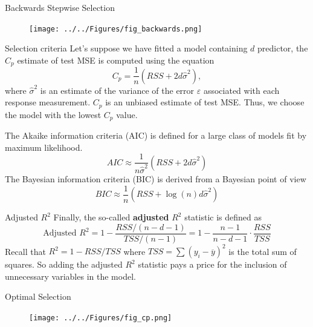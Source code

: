 \documentclass{beamer}
\begin{document}
\begin{frame}{Backwards Stepwise Selection}
	
	\begin{figure}[h]
		\centering
		\texttt{[image: ../../Figures/fig\_backwards.png]}
	\end{figure}
\end{frame}

\begin{frame}{Selection criteria}
	Let's suppose we have fitted a model containing $d$ predictor, the $C_p$ estimate of test MSE is computed using the equation
	\begin{equation*}
		C_p= \frac{1}{n} (RSS+ 2d \hat{\sigma}^2),
	\end{equation*}
	where $\hat{\sigma}^2$ is an estimate of the variance of the error $\varepsilon$ associated with each response measurement. $C_p$ is an unbiased estimate of test MSE. Thus, we choose the model with the lowest $C_p$ value. 
	
	The Akaike information criteria (AIC) is defined for a large class of models fit by maximum likelihood. 
	\begin{equation*}
		AIC \approx \frac{1}{n \hat{\sigma}^2} (RSS+ 2d \hat{\sigma}^2)
	\end{equation*}
 The Bayesian information criteria (BIC) is derived from a Bayesian point of view
 \begin{equation*}
 	BIC \approx \frac{1}{n} (RSS+ \log(n)d \hat{\sigma}^2)
 \end{equation*}

\end{frame}

\begin{frame}{Adjusted $R^2$}
	Finally, the so-called {\bf adjusted} $R^2$ statistic is defined as
	\begin{equation*}
		\textrm{Adjusted }R^2= 1 - \frac{RSS/(n-d-1)}{TSS/(n-1)}= 1 - \frac{n-1}{n-d-1} \cdot \frac{RSS}{TSS}
	\end{equation*}
Recall that $R^2= 1 - RSS/TSS$ where $TSS= \sum (y_i - \overline{y})^2$ is the total sum of squares. 
 So adding the adjusted $R^2$ statistic pays a price for the inclusion of unnecessary variables in the model. 

\end{frame}

\begin{frame}{Optimal Selection}
	
	
 \begin{figure}[h]
	\centering
	\texttt{[image: ../../Figures/fig\_cp.png]}
\end{figure}
\end{frame}
\end{document}
